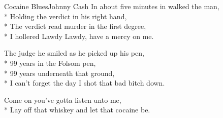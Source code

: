 \documentclass[10.5pt]{book}
\begin{document}
\begin{poem}{Cocaine Blues}{Johnny Cash}
In about five minutes in walked the man,\\*
Holding the verdict in his right hand,\\*
The verdict read murder in the first degree,\\*
I hollered Lawdy Lawdy, have a mercy on me.

The judge he smiled as he picked up his pen,\\*
99 years in the Folsom pen,\\*
99 years underneath that ground,\\*
I can't forget the day I shot that bad bitch down.

Come on you've gotta listen unto me,\\*
Lay off that whiskey and let that cocaine be.

\end{poem}
\end{document}
